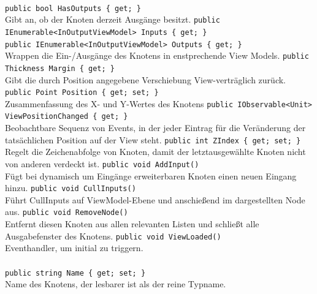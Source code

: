 \paragraph{}
\begin{itemize}
	\add \verb!public bool HasOutputs { get; }! \\
	Gibt an, ob der Knoten derzeit Ausgänge besitzt.
	\add \verb!public IEnumerable<InOutputViewModel> Inputs { get; }! \\
	\verb!public IEnumerable<InOutputViewModel> Outputs { get; }! \\
	Wrappen die Ein-/Ausgänge des Knotens in enstprechende View Models.
	\add \verb!public Thickness Margin { get; }! \\
	Gibt die durch Position angegebene Verschiebung View-verträglich zurück.
	\add \verb!public Point Position { get; set; }! \\
	Zusammenfassung des X- und Y-Wertes des Knotens
	\add \verb!public IObservable<Unit> ViewPositionChanged { get; }! \\
	Beobachtbare Sequenz von Events, in der jeder Eintrag für die Veränderung der tatsächlichen Position auf der View steht.
	\add \verb!public int ZIndex { get; set; }! \\
	Regelt die Zeichenabfolge von Knoten, damit der letztausgewählte Knoten nicht von anderen verdeckt ist.
	\add \verb!public void AddInput()! \\
	Fügt bei dynamisch um Eingänge erweiterbaren Knoten einen neuen Eingang hinzu.
	\add \verb!public void CullInputs()! \\
	Führt CullInputs auf ViewModel-Ebene und anschießend im dargestellten Node aus.
	\add \verb!public void RemoveNode()! \\
	Entfernt diesen Knoten aus allen relevanten Listen und schließt alle Ausgabefenster des Knotens.
	\add \verb!public void ViewLoaded()! \\
	Eventhandler, um  initial zu triggern.
\end{itemize}

\paragraph{}
\begin{itemize}
	\add \verb!public string Name { get; set; }! \\
	Name des Knotens, der lesbarer ist als der reine Typname.
\end{itemize}

